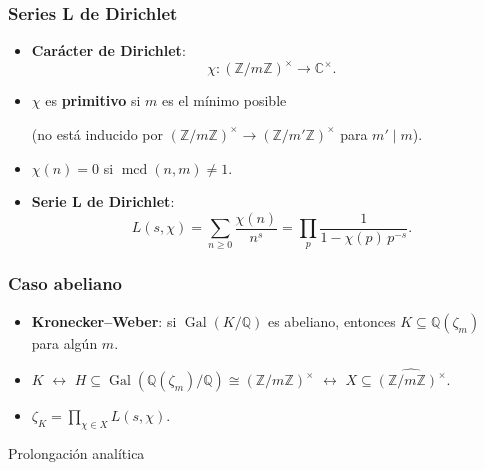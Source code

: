 \documentclass[handout]{beamer}
\newcommand{\ZZ}{\mathbb{Z}}
\newcommand{\QQ}{\mathbb{Q}}
\newcommand{\CC}{\mathbb{C}}
\DeclareMathOperator{\Gal}{Gal}
\renewcommand{\gcd}{\operatorname{mcd}}
\begin{document}

\begin{frame}
  \frametitle{Series L de Dirichlet}

  \begin{itemize}
  \item<1-> \textbf{Carácter de Dirichlet}:
    $$\chi\colon (\ZZ/m\ZZ)^\times \to \CC^\times.$$

  \item<2-> $\chi$ es \textbf{primitivo} si $m$ es el mínimo posible

    (no está inducido por $(\ZZ/m\ZZ)^\times \to (\ZZ/m'\ZZ)^\times$
    para $m' \mid m$).

  \item<3-> $\chi (n) = 0$ si $\gcd (n,m) \ne 1$.

  \item<4-> \textbf{Serie L de Dirichlet}:
    $$L (s,\chi) = \sum_{n \ge 0} \frac{\chi(n)}{n^s} = \prod_p \frac{1}{1 - \chi(p)\,p^{-s}}.$$
  \end{itemize}
\end{frame}


\begin{frame}
  \frametitle{Caso abeliano}

  \begin{itemize}
  \item<1-> \textbf{Kronecker--Weber}: si $\Gal (K/\QQ)$ es abeliano, entonces
    $K \subseteq \QQ (\zeta_m)$ para algún $m$.

  \item<2-> $K$ $\leftrightarrow$ $H \subseteq \Gal (\QQ (\zeta_m)/\QQ) \cong (\ZZ/m\ZZ)^\times$
     $\leftrightarrow$ $X \subseteq \widehat{(\ZZ/m\ZZ)^\times}$.

  \item<3-> $\zeta_K = \prod_{\chi \in X} L (s,\chi).$
  \end{itemize}
\end{frame}


\begin{frame}[plain]
  \headingfont

  \begin{center}
    {\huge Prolongación analítica}
  \end{center}
\end{frame}
\end{document}
